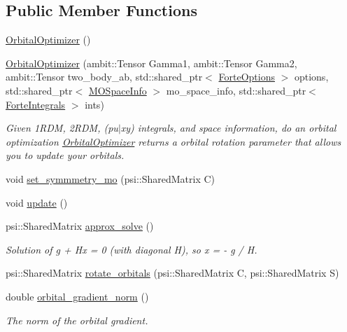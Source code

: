 \subsection*{Public Member Functions}
\begin{DoxyCompactItemize}
\item 
\mbox{\hyperlink{classforte_1_1_orbital_optimizer_a6026a400fc34ad76ebe1d1ddf8999f8e}{Orbital\+Optimizer}} ()
\item 
\mbox{\hyperlink{classforte_1_1_orbital_optimizer_a5033f80887f8b72341e522a54216fa97}{Orbital\+Optimizer}} (ambit\+::\+Tensor Gamma1, ambit\+::\+Tensor Gamma2, ambit\+::\+Tensor two\+\_\+body\+\_\+ab, std\+::shared\+\_\+ptr$<$ \mbox{\hyperlink{classforte_1_1_forte_options}{Forte\+Options}} $>$ options, std\+::shared\+\_\+ptr$<$ \mbox{\hyperlink{classforte_1_1_m_o_space_info}{M\+O\+Space\+Info}} $>$ mo\+\_\+space\+\_\+info, std\+::shared\+\_\+ptr$<$ \mbox{\hyperlink{classforte_1_1_forte_integrals}{Forte\+Integrals}} $>$ ints)
\begin{DoxyCompactList}\small\item\em Given 1\+R\+DM, 2\+R\+DM, (pu$\vert$xy) integrals, and space information, do an orbital optimization \mbox{\hyperlink{classforte_1_1_orbital_optimizer}{Orbital\+Optimizer}} returns a orbital rotation parameter that allows you to update your orbitals. \end{DoxyCompactList}\item 
void \mbox{\hyperlink{classforte_1_1_orbital_optimizer_ad52632ad818dc34312c7763a6020d74d}{set\+\_\+symmmetry\+\_\+mo}} (psi\+::\+Shared\+Matrix C)
\item 
void \mbox{\hyperlink{classforte_1_1_orbital_optimizer_a575a256f93d9c3ca9d8eb388a9f51f79}{update}} ()
\item 
psi\+::\+Shared\+Matrix \mbox{\hyperlink{classforte_1_1_orbital_optimizer_a9f998520c061013d80501e85b7b302d5}{approx\+\_\+solve}} ()
\begin{DoxyCompactList}\small\item\em Solution of g + Hx = 0 (with diagonal H), so x = -\/ g / H. \end{DoxyCompactList}\item 
psi\+::\+Shared\+Matrix \mbox{\hyperlink{classforte_1_1_orbital_optimizer_a98809e4d8fe5a75f5ec20773ae6d4274}{rotate\+\_\+orbitals}} (psi\+::\+Shared\+Matrix C, psi\+::\+Shared\+Matrix S)
\item 
double \mbox{\hyperlink{classforte_1_1_orbital_optimizer_a974d61893017eb0baf4c7c73321b75f8}{orbital\+\_\+gradient\+\_\+norm}} ()
\begin{DoxyCompactList}\small\item\em The norm of the orbital gradient. \end{DoxyCompactList}\item 

\end{DoxyCompactItemize}
